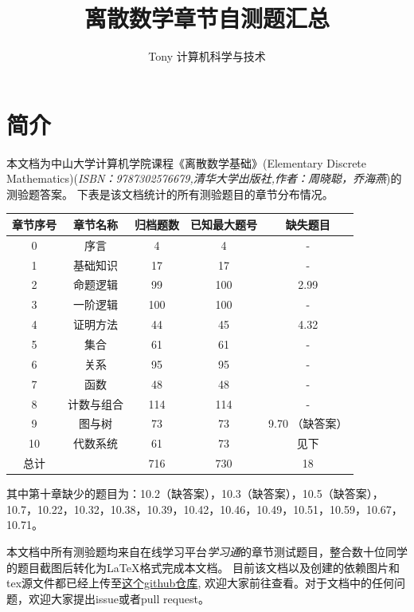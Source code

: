 \documentclass[UTF8, heading=true]{ctexart}
\title{\LARGE \textbf{离散数学章节自测题汇总}}
\author{Tony \hspace{2.89cm} 计算机科学与技术}
\begin{document}
\maketitle




{}
\section*{简介}

本文档为中山大学计算机学院课程《离散数学基础》(Elementary Discrete Mathematics)(\textit{ISBN：9787302576679,清华大学出版社,作者：周晓聪，乔海燕})的测验题答案。
下表是该文档统计的所有测验题目的章节分布情况。
\begin{table}[H]
  \renewcommand{\arraystretch}{1.5}
  \centering
\begin{tabular}{|c|c|c|c|c|}
  \hline 章节序号 & 章节名称 & 归档题数 & 已知最大题号 & 缺失题目 \\
  \hline 0 & 序言 & 4 & 4 & - \\
  \hline 1 & 基础知识 & 17 & 17 & - \\
  \hline 2 & 命题逻辑 & 99 & 100 & 2.99 \\
  \hline 3 & 一阶逻辑 & 100 & 100 & - \\
  \hline 4 & 证明方法 & 44 & 45 & 4.32 \\
  \hline 5 & 集合 & 61 & 61 & - \\
  \hline 6 & 关系 & 95 & 95 & - \\
  \hline 7 & 函数 & 48 & 48 & - \\
  \hline 8 & 计数与组合 & 114 & 114 & - \\
  \hline 9 & 图与树 & 73 & 73 & 9.70 （缺答案） \\
  \hline 10 & 代数系统 & 61 & 73 & 见下 \\
  \hline 总计& & 716 & 730 & 18 \\
  \hline
  \end{tabular}
\end{table}

其中第十章缺少的题目为：10.2（缺答案），10.3（缺答案），10.5（缺答案），10.7，10.22，10.32，10.38，10.39，10.42，10.46，10.49，10.51，10.59，10.67，10.71。

本文档中所有测验题均来自在线学习平台\textit{学习通}的章节测试题目，整合数十位同学的题目截图后转化为LaTeX格式完成本文档。
目前该文档以及创建的依赖图片和tex源文件都已经上传至\href{https://github.com/BlackMaple1203/SYSU-Discrete-Mathematics-Exam-Answers}{这个github仓库},
欢迎大家前往查看。对于文档中的任何问题，欢迎大家提出issue或者pull request。
\end{document}
